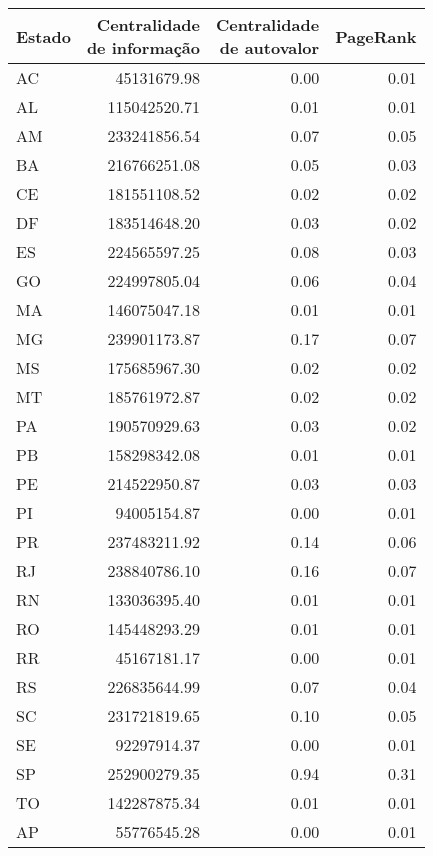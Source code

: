 
\centering
\begin{tabular}{lrrr}
\toprule
Estado &  \shortstack{Centralidade\\de informação} &  \shortstack{Centralidade\\de autovalor} &  PageRank \\
\midrule
AC &             45131679.98 &                    0.00 &      0.01 \\
AL &            115042520.71 &                    0.01 &      0.01 \\
AM &            233241856.54 &                    0.07 &      0.05 \\
BA &            216766251.08 &                    0.05 &      0.03 \\
CE &            181551108.52 &                    0.02 &      0.02 \\
DF &            183514648.20 &                    0.03 &      0.02 \\
ES &            224565597.25 &                    0.08 &      0.03 \\
GO &            224997805.04 &                    0.06 &      0.04 \\
MA &            146075047.18 &                    0.01 &      0.01 \\
MG &            239901173.87 &                    0.17 &      0.07 \\
MS &            175685967.30 &                    0.02 &      0.02 \\
MT &            185761972.87 &                    0.02 &      0.02 \\
PA &            190570929.63 &                    0.03 &      0.02 \\
PB &            158298342.08 &                    0.01 &      0.01 \\
PE &            214522950.87 &                    0.03 &      0.03 \\
PI &             94005154.87 &                    0.00 &      0.01 \\
PR &            237483211.92 &                    0.14 &      0.06 \\
RJ &            238840786.10 &                    0.16 &      0.07 \\
RN &            133036395.40 &                    0.01 &      0.01 \\
RO &            145448293.29 &                    0.01 &      0.01 \\
RR &             45167181.17 &                    0.00 &      0.01 \\
RS &            226835644.99 &                    0.07 &      0.04 \\
SC &            231721819.65 &                    0.10 &      0.05 \\
SE &             92297914.37 &                    0.00 &      0.01 \\
SP &            252900279.35 &                    0.94 &      0.31 \\
TO &            142287875.34 &                    0.01 &      0.01 \\
AP &             55776545.28 &                    0.00 &      0.01 \\
\bottomrule
\end{tabular}

